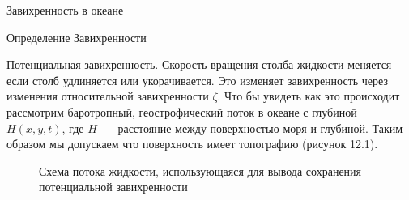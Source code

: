 \begin{chapter}{Завихренность в океане}
\begin{section}{Определение Завихренности}
\begin{paragraph}{Потенциальная завихренность.}
Скорость вращения столба жидкости меняется если столб удлиняется или
укорачивается. Это изменяет завихренность через изменения
относительной завихренности $\zeta$. Что бы увидеть как это происходит
рассмотрим баротропный, геострофический поток в океане с глубиной
$H(x, y, t)$, где $H$~--- расстояние между поверхностью моря и
глубиной. Таким образом мы допускаем что поверхность имеет топографию
(рисунок 12.1).
%

\begin{figure}[t!]
\begin{center}
\end{center}
\caption{Схема потока жидкости, использующаяся для вывода сохранения
потенциальной завихренности}
\label{fig:vorticitysketch}
\vspace{-3ex}
\end{figure}
%
%


\end{paragraph}
\end{section}
\end{chapter}
